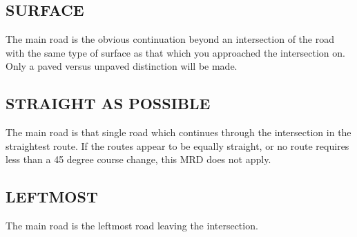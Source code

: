 \subsection{SURFACE}
The main road is the obvious continuation beyond an intersection of the road with the same type of surface as that which you approached the intersection on.  Only a paved versus unpaved distinction will be made.

\subsection{STRAIGHT AS POSSIBLE}
The main road is that single road which continues through the intersection in the straightest route.  If the routes appear to be equally straight, or no route requires less than a 45 degree course change, this MRD does not apply.

\subsection{LEFTMOST}
The main road is the leftmost road leaving the intersection.
